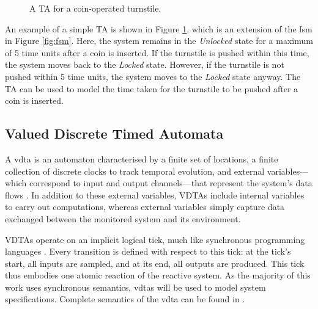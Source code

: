 \begin{figure}[htbp] \label{fig:ta}
 \centering
 \caption{A TA for a coin-operated turnstile.}
 \label{fig:ta}
\end{figure}

An example of a simple TA is shown in Figure \ref{fig:ta}, which is an extension of the \gls{fsm} in Figure \ref{fig:fsm}. Here, the system remains in the \emph{Unlocked} state for a maximum of 5 time units after a coin is inserted. If the turnstile is pushed within this time, the system moves back to the \emph{Locked} state. However, if the turnstile is not pushed within 5 time units, the system moves to the \emph{Locked} state anyway. The TA can be used to model the time taken for the turnstile to be pushed after a coin is inserted.

\subsection{Valued Discrete Timed Automata}

A \gls{vdta} is an automaton characterised by a finite set of locations, a finite collection of discrete clocks to track temporal evolution, and external variables—which correspond to input and output channels—that represent the system's data flows \cite{pearce_smart_2020}. In addition to these external variables, VDTAs include internal variables to carry out computations, whereas external variables simply capture data exchanged between the monitored system and its environment.

VDTAs operate on an implicit logical tick, much like synchronous programming languages \cite{benveniste_synchronous_2003}. Every transition is defined with respect to this tick: at the tick's start, all inputs are sampled, and at its end, all outputs are produced. This tick thus embodies one atomic reaction of the reactive system. As the majority of this work uses synchronous semantics, \glspl{vdta} will be used to model system specifications. Complete semantics of the \gls{vdta} can be found in \cite{pearce_smart_2020}.



